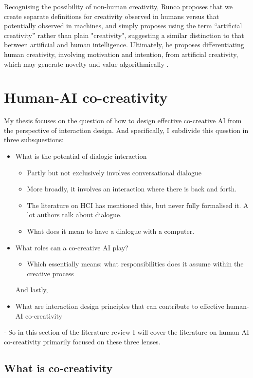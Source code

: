 Recognising the possibility of non-human creativity, Runco proposes that we create separate definitions for creativity observed in humans versus that potentially observed in machines, and simply proposes using the term “artificial creativity” rather than plain "creativity", suggesting a similar distinction to that between artificial and human intelligence. Ultimately, he proposes differentiating human creativity, involving motivation and intention, from artificial creativity, which may generate novelty and value algorithmically \cite{Runco2023-qi}.


\section{Human-AI co-creativity}

My thesis focuses on the question of how to design effective co-creative AI from the perspective of interaction design.
And specifically, I subdivide this question in three subsquestions: 
\begin{itemize}
  \item What is the potential of dialogic interaction
  \begin{itemize}
    \item Partly but not exclusively involves conversational dialogue
    \item More broadly, it involves an interaction where there is back and forth. 
    \item The literature on HCI has mentioned this, but never fully formalised it. A lot authors talk about dialogue. 
    \item What does it mean to have a dialogue with a computer. 
  \end{itemize}
  \item What roles can a co-creative AI play? 
  \begin{itemize}
    \item Which essentially means: what responsibilities does it assume within the creative process
  \end{itemize}
And lastly, 
  \item What are interaction design principles that can contribute to effective human-AI co-creativity
\end{itemize}


- So in this section of the literature review I will cover the literature on human AI co-creativity primarily focused on these three lenses. 

\subsection{What is co-creativity}

